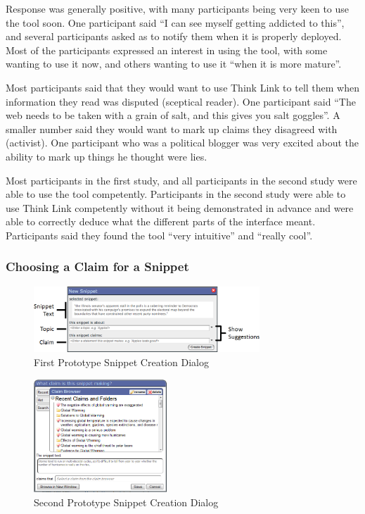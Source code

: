 \documentclass{chi2009}
\begin{document}
Response was generally positive, with many participants being very keen to use the tool soon. One participant said ``I can see myself getting addicted to this'', and several participants asked as to notify them when it is properly deployed. Most of the participants expressed an interest in using the tool, with some wanting to use it now, and others wanting to use it ``when it is more mature''.

Most participants said that they would want to use Think Link to tell them when information they read was disputed (sceptical reader). One participant said ``The web needs to be taken with a grain of salt, and this gives you salt goggles''. A smaller number said they would want to mark up claims they disagreed with (activist). One participant who was a political blogger was very excited about the ability to mark up things he thought were lies.

Most participants in the first study, and all participants in the second study were able to use the tool competently. Participants in the second study were able to use Think Link competently without it being demonstrated in advance and were able to correctly deduce what the different parts of the interface meant. Participants said they found the tool ``very intuitive'' and ``really cool''.

\subsubsection{Choosing a Claim for a Snippet}

\begin{figure}[t]
	\includegraphics[width=8.5cm]{../screenshots/oldsnipcreate_diagram.png}
	\caption{First Prototype Snippet Creation Dialog}
	\label{oldsnippetbox}
\end{figure}

\begin{figure}[t]
\begin{center}
	\includegraphics[width=5cm]{../screenshots/newsnip_browseopen.png}
	\caption{Second Prototype Snippet Creation Dialog}
	\label{secondsnippetbox}
\end{center}
\end{figure}
\end{document}
